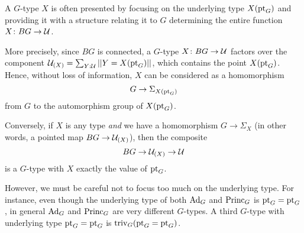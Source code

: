 \begin{remark}
  \label{remark:GsetsareGsets}
  A $G$-type $X$ is often presented by focusing on the underlying type $X({\mathord{\mathrm{pt}}}_G)$  and providing it with a structure relating it to $G$ determining the entire function $X\colon BG\to\mathcal{U}$.

More precisely, since $BG$ is connected, a $G$-type $X\colon BG\to\mathcal{U}$ factors over the component $\mathcal{U}_{(X)}=\sum_{Y:\mathcal{U}}||Y=X({\mathord{\mathrm{pt}}}_G)||$, which contains the point $X({\mathord{\mathrm{pt}}}_G)$.  Hence, without loss of information, $X$ can be considered as a homomorphism 
$$G\to\Sigma_{X({\mathord{\mathrm{pt}}}_G)}$$ from $G$ to the automorphism group of $X({\mathord{\mathrm{pt}}}_G)$.

Conversely, if $X$ is any type \emph{and} we have a homomorphism $G\to\Sigma_X$ (in other words, a pointed map $BG\to\mathcal{U}_{(X)}$), then the composite
$$BG\to \mathcal{U}_{(X)}\to \mathcal{U}$$
is a $G$-type with $X$ exactly the value of ${\mathord{\mathrm{pt}}}_G$.

However, we must be careful not to focus too much on the underlying type.  For instance, even though the underlying type of both $\mathrm{Ad}_G$ and $\mathrm{Princ}_G$ is ${\mathord{\mathrm{pt}}}_G={\mathord{\mathrm{pt}}}_G$, in general  $\mathrm{Ad}_G$ and $\mathrm{Princ}_G$  are very different $G$-types.  A third $G$-type with underlying type ${\mathord{\mathrm{pt}}}_G={\mathord{\mathrm{pt}}}_G$ is $\mathrm{triv}_G({\mathord{\mathrm{pt}}}_G={\mathord{\mathrm{pt}}}_G)$.
\end{remark}

